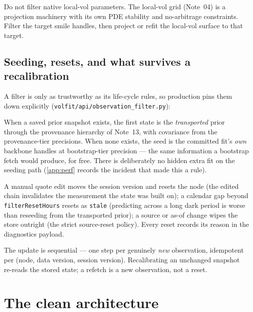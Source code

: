 \documentclass[11pt]{article}
\begin{document}
\begin{caution}
Do not filter native local-vol parameters. The local-vol grid (Note~04) is a
projection machinery with its own PDE stability and no-arbitrage constraints.
Filter the target smile handles, then project or refit the local-vol surface
to that target.
\end{caution}

\subsection{Seeding, resets, and what survives a recalibration}
\label{sec:lifecycle}

A filter is only as trustworthy as its life-cycle rules, so production pins
them down explicitly (\texttt{volfit/api/observation\_filter.py}):

\begin{description}[leftmargin=1.7em,style=nextline]
\item[Seeding.] When a saved prior snapshot exists, the first state is the
\emph{transported} prior through the provenance hierarchy of Note~13, with
covariance from the provenance-tier precisions. When none exists, the seed is
the committed fit's \emph{own} backbone handles at bootstrap-tier precision
--- the same information a bootstrap fetch would produce, for free. There is
deliberately no hidden extra fit on the seeding path (\cref{app:perf} records
the incident that made this a rule).
\item[Resets.] A manual quote edit moves the session version and resets the
node (the edited chain invalidates the measurement the state was built on); a
calendar gap beyond \texttt{filterResetHours} resets as \texttt{stale}
(predicting across a long dark period is worse than reseeding from the
transported prior); a source or as-of change wipes the store outright (the
strict source-reset policy). Every reset records its reason in the
diagnostics payload.
\item[Recalibration keeps the state.] The update is sequential --- one step per
genuinely \emph{new} observation, idempotent per (node, data version, session
version). Recalibrating an unchanged snapshot re-reads the stored state; a
refetch is a new observation, not a reset.
\end{description}

\section{The clean architecture}
\label{sec:architecture}
\end{document}
